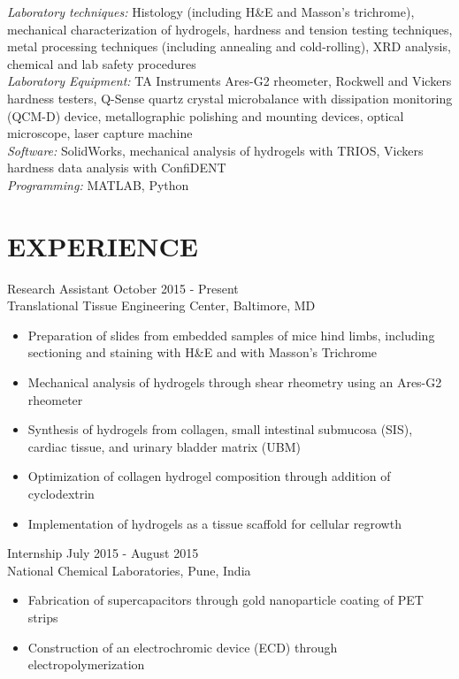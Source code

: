 \documentclass[line, 10pt]{res} %
\begin{document}
\begin{resume}
{\sl Laboratory techniques:} Histology (including H\&E and Masson's trichrome), mechanical characterization of hydrogels, hardness and tension testing techniques, metal processing techniques (including annealing and cold-rolling), XRD analysis, chemical and lab safety procedures \\
{\sl Laboratory Equipment:} TA Instruments Ares-G2 rheometer, Rockwell and Vickers hardness testers, Q-Sense quartz crystal microbalance with dissipation monitoring (QCM-D) device, metallographic polishing and mounting devices, optical microscope, laser capture machine\\
{\sl Software:}  SolidWorks, mechanical analysis of hydrogels with TRIOS, Vickers hardness data analysis with ConfiDENT\\
{\sl Programming:} MATLAB, Python \\
 
\vspace{-0.3cm}
\section{\large EXPERIENCE}

{\sc \large Research Assistant} \hfill October 2015 - Present \\
Translational Tissue Engineering Center, Baltimore, MD
\begin{itemize}
\item Preparation of slides from embedded samples of mice hind limbs, including sectioning and staining with H\&E and with Masson's Trichrome
\item Mechanical analysis of hydrogels through shear rheometry using an Ares-G2\\ rheometer
\item Synthesis of hydrogels from collagen, small intestinal submucosa (SIS), cardiac tissue, and urinary bladder matrix (UBM)
\item Optimization of collagen hydrogel composition through addition of cyclodextrin
\item Implementation of hydrogels as a tissue scaffold for cellular regrowth
\end{itemize}

{\sc \large Internship} \hfill July 2015 - August 2015\\
National Chemical Laboratories, Pune, India
\begin{itemize}
\item Fabrication of supercapacitors through gold nanoparticle coating of PET strips 
\item Construction of an electrochromic device (ECD) through  electropolymerization
\end{itemize}


\end{resume}
\end{document}
